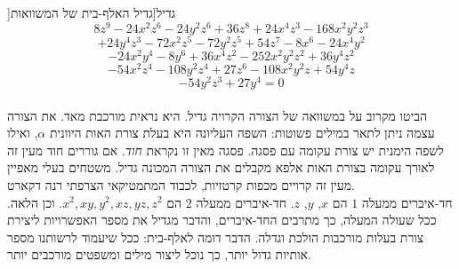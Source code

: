 \begin{surferPage}]גדיל[{גדיל}
האלף-בית של המשוואות
  \smallskip
\[8z^9-24x^2z^6-24y^2z^6+36z^8+24x^4z^3-168x^2y^2z^3\]
\[+24y^4z^3-72x^2z^5-72y^2z^5+54z^7-8x^6-24x^4y^2\]
\[-24x^2y^4-8y^6 + 36x^4z^2-252x^2y^2z^2+36y^4z^2\]
\[- 54x^2z^4-108y^2z^4 + 27z^6-108x^2y^2z + 54y^4z\]
\[-54y^2z^3 + 27y^4 = 0\]\\
\vspace{0,3cm}
הביטו מקרוב על במשוואה של הצורה הקרויה גדיל. היא נראית מורכבת מאד.
את הצורה עצמה ניתן לתאר במילים פשוטות: השפה העליונה היא בעלת צורת האות היוונית $\alpha$, ואילו לשפה הימנית יש צורת עקומה עם פסגה. פסגה מאין זו נקראת {\it חוד}. אם גוררים חוד מעין זה לאורך עקומה בצורת האות אלפא מקבלים את הצורה המכונה גדיל. משטחים בעלי מאפיין מעין זה קרויים מכפות קרטזיות, לכבוד המתמטיקאי הצרפתי רנה דקארט.\\
\vspace{0,3cm}
חד-איברים ממעלה $1$ הם $x$, $y$, $z$. חד-איברים ממעלה $2$ הם $x^2, xy, y^2, xz, yz, z^2$. וכן הלאה. ככל שעולה המעלה, כך מתרבים החד-איברים, והדבר מגדיל את מספר האפשרויות ליצירת צורת בעלות מורכבות הולכת וגדלה. הדבר דומה לאלף-בית: ככל שיעמוד לרשותנו מספר אותיות גדול יותר, כך נוכל ליצור מילים ומשפטים מורכבים יותר.
\end{surferPage}
